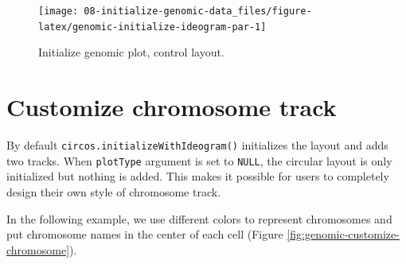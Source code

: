 \documentclass[]{book}
\newenvironment{Shaded}{\begin{snugshade}}{\end{snugshade}}
\newcommand{\KeywordTok}[1]{\textcolor[rgb]{0.13,0.29,0.53}{\textbf{#1}}}
\newcommand{\DataTypeTok}[1]{\textcolor[rgb]{0.13,0.29,0.53}{#1}}
\newcommand{\DecValTok}[1]{\textcolor[rgb]{0.00,0.00,0.81}{#1}}
\newcommand{\FloatTok}[1]{\textcolor[rgb]{0.00,0.00,0.81}{#1}}
\newcommand{\StringTok}[1]{\textcolor[rgb]{0.31,0.60,0.02}{#1}}
\newcommand{\OtherTok}[1]{\textcolor[rgb]{0.56,0.35,0.01}{#1}}
\newcommand{\ControlFlowTok}[1]{\textcolor[rgb]{0.13,0.29,0.53}{\textbf{#1}}}
\newcommand{\OperatorTok}[1]{\textcolor[rgb]{0.81,0.36,0.00}{\textbf{#1}}}
\newcommand{\NormalTok}[1]{#1}
\theoremstyle{definition}
\theoremstyle{definition}
\theoremstyle{remark}
\begin{document}
\begin{figure}

{\centering \texttt{[image: 08-initialize-genomic-data\_files/figure-latex/genomic-initialize-ideogram-par-1]} 

}

\caption{Initialize genomic plot, control layout.}\label{fig:genomic-initialize-ideogram-par}
\end{figure}

\section{Customize chromosome track}\label{customize-chromosome-track}

By default \texttt{circos.initializeWithIdeogram()} initializes the
layout and adds two tracks. When \texttt{plotType} argument is set to
\texttt{NULL}, the circular layout is only initialized but nothing is
added. This makes it possible for users to completely design their own
style of chromosome track.

In the following example, we use different colors to represent
chromosomes and put chromosome names in the center of each cell (Figure
\ref{fig:genomic-customize-chromosome}).

\begin{Shaded}
\end{Shaded}
\end{document}
